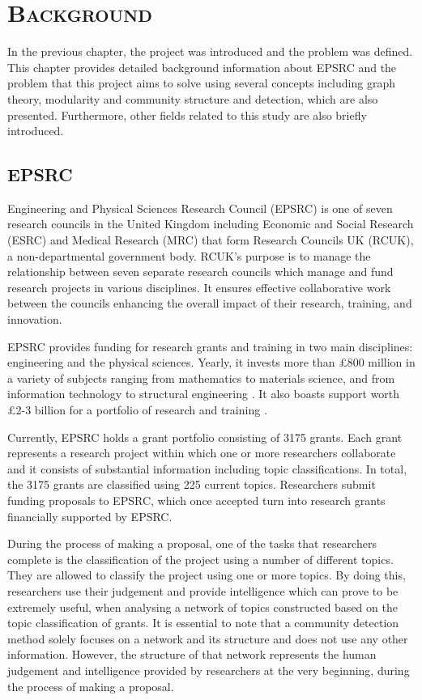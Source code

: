 \chapter{\textsc{Background}}
\label{chapterlabel2}

In the previous chapter, the project was introduced and the problem was defined. This chapter provides detailed background information about EPSRC and the problem that this project aims to solve using several concepts including graph theory, modularity and community structure and detection, which are also presented. Furthermore, other fields related to this study are also briefly introduced.

\section{EPSRC}

Engineering and Physical Sciences Research Council (EPSRC) is one of seven research councils in the United Kingdom including Economic and Social Research (ESRC) and Medical Research (MRC) that form Research Councils UK (RCUK), a non-departmental government body. RCUK's purpose is to manage the relationship between seven separate research councils which manage and fund research projects in various disciplines. It ensures effective collaborative work between the councils enhancing the overall impact of their research, training, and innovation.

EPSRC provides funding for research grants and training in two main disciplines: engineering and the physical sciences. Yearly, it invests more than \pounds800 million in a variety of subjects ranging from mathematics to materials science, and from information technology to structural engineering \cite{epsrc_about_us}. It also boasts support worth \pounds2-3 billion for a portfolio of research and training \cite{epsrc_our_portfolio}.

Currently, EPSRC holds a grant portfolio consisting of 3175 grants. Each grant represents a research project within which one or more researchers collaborate and it consists of substantial information including topic classifications. In total, the 3175 grants are classified using 225 current topics. Researchers submit funding proposals to EPSRC, which once accepted turn into research grants financially supported by EPSRC.

During the process of making a proposal, one of the tasks that researchers complete is the classification of the project using a number of different topics. They are allowed to classify the project using one or more topics. By doing this, researchers use their judgement and provide intelligence which can prove to be extremely useful, when analysing a network of topics constructed based on the topic classification of grants. It is essential to note that a community detection method solely focuses on a network and its structure and does not use any other information. However, the structure of that network represents the human judgement and intelligence provided by researchers at the very beginning, during the process of making a proposal. 

